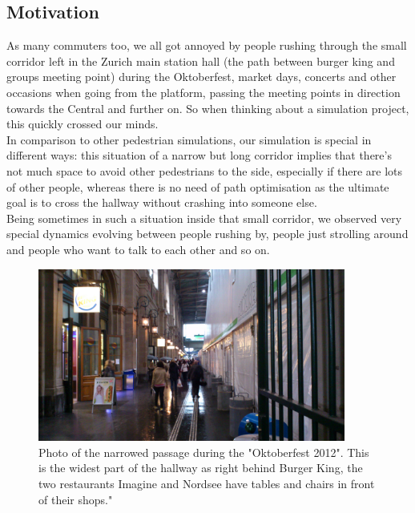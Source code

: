 

\subsection{Motivation}
As many commuters too, we all got annoyed by people rushing through the small corridor left in the Zurich main station hall (the path between burger king and groups meeting point) during the Oktoberfest, market days, concerts and other occasions when going from the platform, passing the meeting points in direction towards the Central and further on. So when thinking about a simulation project, this quickly crossed our minds.\\
In comparison to other pedestrian simulations, our simulation is special in different ways: this situation of a narrow but long corridor implies that there's not much space to avoid other pedestrians to the side, especially if there are lots of other people, whereas there is no need of path optimisation as the ultimate goal is to cross the hallway without crashing into someone else.\\
Being sometimes in such a situation inside that small corridor, we observed very special dynamics evolving between people rushing by, people just strolling around and people who want to talk to each other and so on.

\begin{figure}[h!]
	\centering
		\includegraphics[width=0.90\textwidth]{pictures/oktoberfest2}
	\caption{Photo of the narrowed passage during the "Oktoberfest 2012". This is the widest part of the hallway as right behind Burger King, the two restaurants Imagine and Nordsee have tables and chairs in front of their shops."}
	\label{fig:oktoberfest2}
\end{figure}


